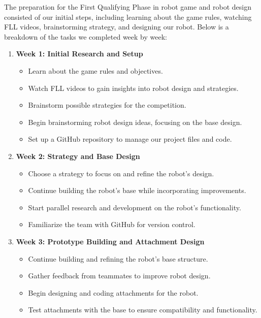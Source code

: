 The preparation for the First Qualifying Phase in robot game and robot design consisted of our initial steps, including learning about the game rules, watching FLL videos, brainstorming strategy, and designing our robot. Below is a breakdown of the tasks we completed week by week:

\begin{enumerate}[1.]
    \item \textbf{Week 1: Initial Research and Setup}
    \begin{itemize}
        \item Learn about the game rules and objectives.
        \item Watch FLL videos to gain insights into robot design and strategies.
        \item Brainstorm possible strategies for the competition.
        \item Begin brainstorming robot design ideas, focusing on the base design.
        \item Set up a GitHub repository to manage our project files and code.
    \end{itemize}

    \item \textbf{Week 2: Strategy and Base Design}
    \begin{itemize}
        \item Choose a strategy to focus on and refine the robot’s design.
        \item Continue building the robot’s base while incorporating improvements.
        \item Start parallel research and development on the robot’s functionality.
        \item Familiarize the team with GitHub for version control.
    \end{itemize}
    
    \item \textbf{Week 3: Prototype Building and Attachment Design}
    \begin{itemize}
        \item Continue building and refining the robot's base structure.
        \item Gather feedback from teammates to improve robot design.
        \item Begin designing and coding attachments for the robot.
        \item Test attachments with the base to ensure compatibility and functionality.
    \end{itemize}


\end{enumerate}
